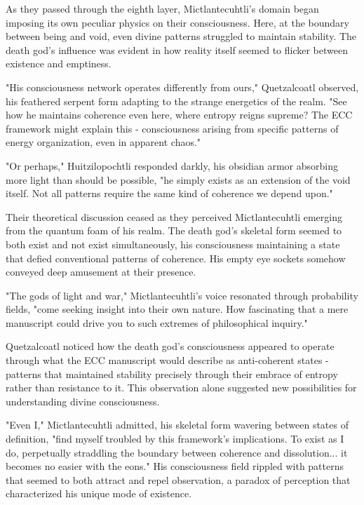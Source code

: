 \begin{refsection}
As they passed through the eighth layer, Mictlantecuhtli's domain began imposing its own peculiar physics on their consciousness. Here, at the boundary between being and void, even divine patterns struggled to maintain stability. The death god's influence was evident in how reality itself seemed to flicker between existence and emptiness.

"His consciousness network operates differently from ours," Quetzalcoatl observed, his feathered serpent form adapting to the strange energetics of the realm. "See how he maintains coherence even here, where entropy reigns supreme? The ECC framework might explain this - consciousness arising from specific patterns of energy organization, even in apparent chaos."

"Or perhaps," Huitzilopochtli responded darkly, his obsidian armor absorbing more light than should be possible, "he simply exists as an extension of the void itself. Not all patterns require the same kind of coherence we depend upon."

Their theoretical discussion ceased as they perceived Mictlantecuhtli emerging from the quantum foam of his realm. The death god's skeletal form seemed to both exist and not exist simultaneously, his consciousness maintaining a state that defied conventional patterns of coherence. His empty eye sockets somehow conveyed deep amusement at their presence.

"The gods of light and war," Mictlantecuhtli's voice resonated through probability fields, "come seeking insight into their own nature. How fascinating that a mere manuscript could drive you to such extremes of philosophical inquiry."

Quetzalcoatl noticed how the death god's consciousness appeared to operate through what the ECC manuscript would describe as anti-coherent states - patterns that maintained stability precisely through their embrace of entropy rather than resistance to it. This observation alone suggested new possibilities for understanding divine consciousness.

"Even I," Mictlantecuhtli admitted, his skeletal form wavering between states of definition, "find myself troubled by this framework's implications. To exist as I do, perpetually straddling the boundary between coherence and dissolution... it becomes no easier with the eons." His consciousness field rippled with patterns that seemed to both attract and repel observation, a paradox of perception that characterized his unique mode of existence.


\end{refsection}
